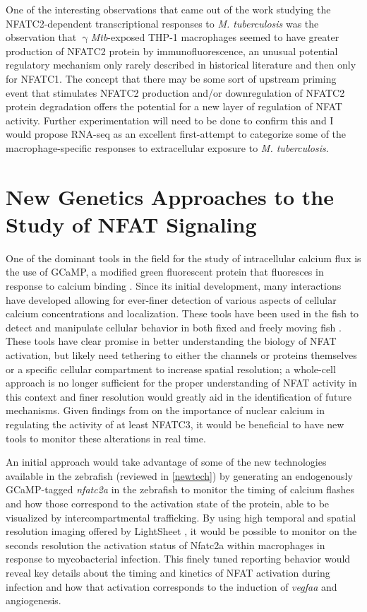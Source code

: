 One of the interesting observations that came out of the work studying the NFATC2\hyp{}dependent transcriptional responses to \textit{M. tuberculosis} was the observation that $\upgamma$\textit{Mtb}\hyp{}exposed THP\hyp{}1 macrophages seemed to have greater production of NFATC2 protein by immunofluorescence, an unusual potential regulatory mechanism only rarely described in historical literature \citep{Asagiri2005, Aramburu1995} and then only for NFATC1. The concept that there may be some sort of upstream priming event that stimulates NFATC2 production and/or downregulation of NFATC2 protein degradation offers the potential for a new layer of regulation of NFAT activity. Further experimentation will need to be done to confirm this and I would propose RNA\hyp{}seq as an excellent first\hyp{}attempt to categorize some of the macrophage\hyp{}specific responses to extracellular exposure to \textit{M. tuberculosis}. 

\section{New Genetics Approaches to the Study of NFAT Signaling}\label{nfatgenetics}

One of the dominant tools in the field for the study of intracellular calcium flux is the use of GCaMP, a modified green fluorescent protein that fluoresces in response to calcium binding \citep{Nakai2001}. Since its initial development, many interactions have developed allowing for ever\hyp{}finer detection of various aspects of cellular calcium concentrations and localization. These tools have been used in the fish to detect and manipulate cellular behavior in both fixed and freely moving fish \citep{Beerman2015, Kim2017}. These tools have clear promise in better understanding the biology of NFAT activation, but likely need tethering to either the channels or proteins themselves or a specific cellular compartment to increase spatial resolution; a whole\hyp{}cell approach is no longer sufficient for the proper understanding of NFAT activity in this context and finer resolution would greatly aid in the identification of future mechanisms. Given findings from \citet{Kar2015} on the importance of nuclear calcium in regulating the activity of at least NFATC3, it would be beneficial to have new tools to monitor these alterations in real time. 

An initial approach would take advantage of some of the new technologies available in the zebrafish (reviewed in \autoref{newtech}) by generating an endogenously GCaMP\hyp{}tagged \textit{nfatc2a} in the zebrafish to monitor the timing of calcium flashes and how those correspond to the activation state of the protein, able to be visualized by intercompartmental trafficking. By using high temporal and spatial resolution imaging offered by LightSheet \citep{Reynaud2008}, it would be possible to monitor on the seconds resolution the activation status of Nfatc2a within macrophages in response to mycobacterial infection. This finely tuned reporting behavior would reveal key details about the timing and kinetics of NFAT activation during infection and how that activation corresponds to the induction of \textit{vegfaa} and angiogenesis.

